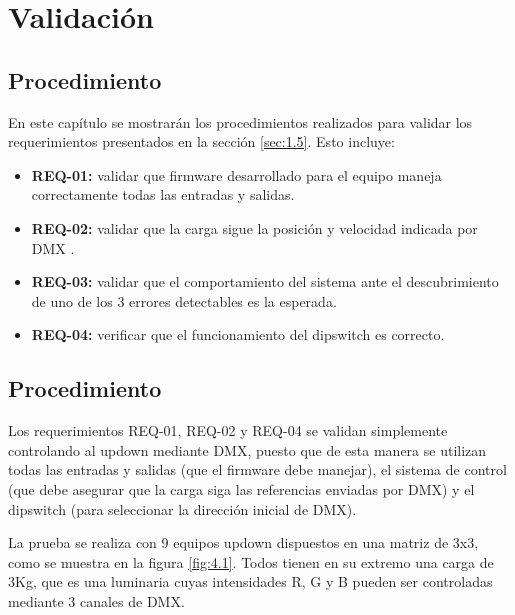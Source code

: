 \chapter{Validación}
\thispagestyle{empty}

\section{Procedimiento}
En este capítulo se mostrarán los procedimientos realizados para validar los requerimientos presentados en la sección \ref{sec:1.5}. Esto incluye:
\begin{itemize}
	\item \textbf{REQ-01:} validar que firmware desarrollado para el equipo maneja correctamente todas las entradas y salidas.
	\item \textbf{REQ-02:} validar que la carga sigue la posición y velocidad indicada por DMX .
	\item \textbf{REQ-03:} validar que el comportamiento del sistema ante el descubrimiento de uno de los 3 errores detectables es la esperada. 
	\item \textbf{REQ-04:} verificar que el funcionamiento del dipswitch es correcto.
\end{itemize}

\section{Procedimiento}
Los requerimientos REQ-01, REQ-02 y REQ-04 se validan simplemente controlando al updown mediante DMX, puesto que de esta manera se utilizan todas las entradas y salidas (que el firmware debe manejar), el sistema de control (que debe asegurar que la carga siga las referencias enviadas por DMX) y el dipswitch (para seleccionar la dirección inicial de DMX).

La prueba se realiza con 9 equipos updown dispuestos en una matriz de 3x3, como se muestra en la figura \ref{fig:4.1}. Todos tienen en su extremo una carga de 3Kg, que es una luminaria cuyas intensidades R, G y B pueden ser controladas mediante 3 canales de DMX.


